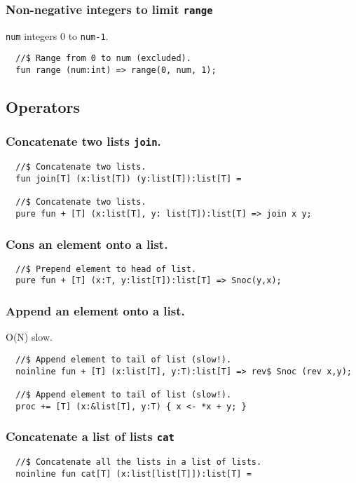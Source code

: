 \documentclass[oneside]{book}
\begin{document}
\subsubsection{Non-negative integers to limit {\tt range}}
{\tt num} integers 0 to {\tt num-1}.

\begin{verbatim}
  //$ Range from 0 to num (excluded).
  fun range (num:int) => range(0, num, 1);
\end{verbatim}

\subsection{Operators}
\subsubsection{Concatenate two lists {\tt join}.}
\begin{verbatim}
  //$ Concatenate two lists.
  fun join[T] (x:list[T]) (y:list[T]):list[T] =
 
  //$ Concatenate two lists.
  pure fun + [T] (x:list[T], y: list[T]):list[T] => join x y;
\end{verbatim}

\subsubsection{Cons an element onto a list.}
\begin{verbatim}
  //$ Prepend element to head of list.
  pure fun + [T] (x:T, y:list[T]):list[T] => Snoc(y,x);
\end{verbatim}

\subsubsection{Append an element onto a list.}
O(N) slow.

\begin{verbatim}
  //$ Append element to tail of list (slow!).
  noinline fun + [T] (x:list[T], y:T):list[T] => rev$ Snoc (rev x,y);

  //$ Append element to tail of list (slow!).
  proc += [T] (x:&list[T], y:T) { x <- *x + y; }
\end{verbatim}

\subsubsection{Concatenate a list of lists {\tt cat}}
\begin{verbatim}
  //$ Concatenate all the lists in a list of lists.
  noinline fun cat[T] (x:list[list[T]]):list[T] =
\end{verbatim}
\end{document}
